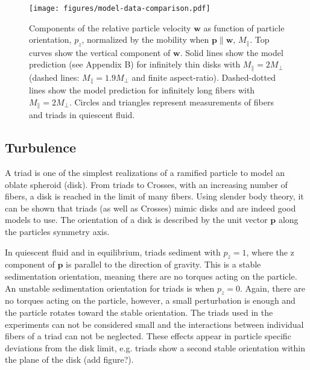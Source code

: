 \documentclass[]{jfm}
\begin{document}
\begin{figure}
\centering
  \texttt{[image: figures/model-data-comparison.pdf]}
  \caption{Components of the relative particle velocity $\mathbf{w}$ as function of particle orientation, $p_z$, normalized by the mobility when $\mathbf{p}\parallel\mathbf{w}$, $M_{\parallel}$.  Top curves show the vertical component of $\mathbf{w}$.  Solid lines show the model prediction (see Appendix B) for infinitely thin disks with $M_{\parallel}{=}2M_{\perp}$ (dashed lines: $M_{\parallel}{=}1.9M_{\perp}$ and finite aspect-ratio).  Dashed-dotted lines show the model prediction for infinitely long fibers with $M_{\parallel}{=}2M_{\perp}$.  Circles and triangles represent measurements of fibers and triads in quiescent fluid.}
	\label{Fig:particle-velocity}
\end{figure}


\subsection{Turbulence}

A triad is one of the simplest realizations of a ramified particle to model an oblate spheroid (disk).  From triads to Crosses, with an increasing number of fibers, a disk is reached in the limit of many fibers.  Using slender body theory, it can be shown that triads (as well as Crosses) mimic disks and are indeed good models to use.  The orientation of a disk is described by the unit vector $\mathbf{p}$ along the particles symmetry axis.  

In quiescent fluid and in equilibrium, triads sediment with $p_z=1$, where the z component of $\mathbf{p}$ is parallel to the direction of gravity.  This is a stable sedimentation orientation, meaning there are no torques acting on the particle. An unstable sedimentation orientation for triads is when $p_z=0$. Again, there are no torques acting on the particle, however, a small perturbation is enough and the particle rotates toward the stable orientation.  The triads used in the experiments can not be considered small and the interactions between individual fibers of a triad can not be neglected.  These effects appear in particle specific deviations from the disk limit, e.g. triads show a second stable orientation within the plane of the disk (add figure?).  
\end{document}
